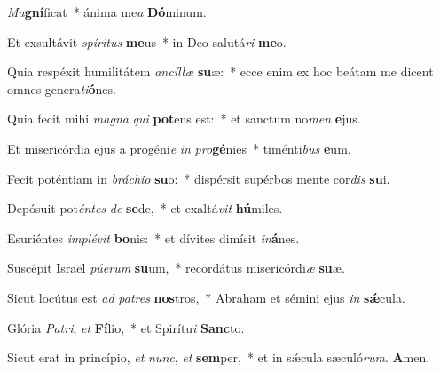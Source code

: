 \item \textit{Ma}\textbf{gní}ficat~* ánima me\textit{a} \textbf{Dó}minum.

\item Et exsultávit \textit{spí}\textit{ri}\textit{tus} \textbf{me}us~* in Deo salutá\textit{ri} \textbf{me}o.

\item Quia respéxit humilitátem \textit{an}\textit{cíl}\textit{læ} \textbf{su}æ:~* ecce enim ex hoc beátam me dicent omnes genera\textit{ti}\textbf{ó}nes.

\item Quia fecit mihi \textit{ma}\textit{gna} \textit{qui} \textbf{pot}ens est:~* et sanctum no\textit{men} \textbf{e}jus.

\item Et misericórdia ejus a progéni\textit{e} \textit{in} \textit{pro}\textbf{gé}nies~* timénti\textit{bus} \textbf{e}um.

\item Fecit poténtiam in \textit{brá}\textit{chi}\textit{o} \textbf{su}o:~* dispérsit supérbos mente cor\textit{dis} \textbf{su}i.

\item Depósuit pot\textit{én}\textit{tes} \textit{de} \textbf{se}de,~* et exaltá\textit{vit} \textbf{hú}miles.

\item Esuriéntes \textit{im}\textit{plé}\textit{vit} \textbf{bo}nis:~* et dívites dimísit \textit{in}\textbf{á}nes.

\item Suscépit Israël \textit{pú}\textit{e}\textit{rum} \textbf{su}um,~* recordátus misericórdi\textit{æ} \textbf{su}æ.

\item Sicut locútus est \textit{ad} \textit{pa}\textit{tres} \textbf{nos}tros,~* Abraham et sémini ejus \textit{in} \textbf{sǽ}cula.

\item Glória \textit{Pa}\textit{tri}, \textit{et} \textbf{Fí}lio,~* et Spirítu\textit{i} \textbf{Sanc}to.

\item Sicut erat in princípio, \textit{et} \textit{nunc}, \textit{et} \textbf{sem}per,~* et in sǽcula sæculó\textit{rum}. \textbf{A}men.